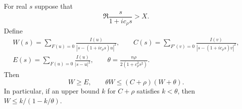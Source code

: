 \begin{lemma}\label{or:HB}
For real $s$ suppose that
\begin{equation}\label{or:Cayley-entrance}
             \Re\frac{s}{1+ic_\rho s}>X.
\end{equation}
Define
\begin{equation}\label{or:source-definitions}
 \begin{gathered}
 W(s)=\sum_{F(u)=0}\frac{I(u)}{|s-(1+ic_\rho s)u|^2},\qquad
 C(s)=\sum_{F'(v)=0}\frac{I(v)}{|s-(1+ic_\rho s)v|^2},\\
 E(s)=\sum_{F(u)=0}\frac{I(u)}{|s-u|^2},\qquad
 \theta=\frac{n\rho}{2(1+c_\rho^2s^2)}.
 \end{gathered}
\end{equation}
Then
\begin{equation}\label{or:HB-inequality}
         W\ge E,\qquad \theta W\le(C+\rho)(W+\theta).
\end{equation}
In particular, if an upper bound $k$ for $C+\rho$ satisfies $k<\theta$,
then $W\le k/(1-k/\theta)$.
\end{lemma}
